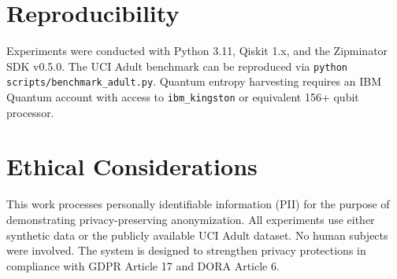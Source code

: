 \documentclass[journal]{IEEEtran}
\begin{document}
\section*{Reproducibility}
Experiments were conducted with Python 3.11, Qiskit 1.x, and the Zipminator SDK v0.5.0.
The UCI Adult benchmark can be reproduced via \texttt{python scripts/benchmark\_adult.py}.
Quantum entropy harvesting requires an IBM Quantum account with access to
\texttt{ibm\_kingston} or equivalent 156+ qubit processor.

\section*{Ethical Considerations}
This work processes personally identifiable information (PII) for the purpose of
demonstrating privacy-preserving anonymization. All experiments use either synthetic
data or the publicly available UCI Adult dataset. No human subjects were involved.
The system is designed to strengthen privacy protections in compliance with
GDPR Article 17 and DORA Article 6.
\end{document}
